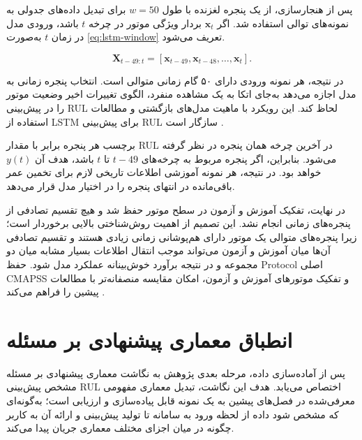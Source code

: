 پس از هنجارسازی، از یک پنجره لغزنده با طول
$w=50$ برای تبدیل داده‌های جدولی به نمونه‌های توالی استفاده شد.
اگر $\mathbf{x}_t$ بردار ویژگی موتور در چرخه $t$ باشد، ورودی مدل
در زمان $t$ به‌صورت 
\ref{eq:lstm-window}
 تعریف می‌شود.

\begin{equation}
	\label{eq:lstm-window}
	\mathbf{X}_{t-49:t}
	=
	[
	\mathbf{x}_{t-49},
	\mathbf{x}_{t-48},
	\ldots,
	\mathbf{x}_{t}
	].
\end{equation}

در نتیجه، هر نمونه ورودی دارای ۵۰ گام زمانی متوالی است. انتخاب
پنجره زمانی به مدل اجازه می‌دهد به‌جای اتکا به یک مشاهده منفرد،
الگوی تغییرات اخیر وضعیت موتور را در پیش‌بینی \gls{RUL} لحاظ کند.
این رویکرد با ماهیت مدل‌های بازگشتی و مطالعات استفاده از LSTM برای
پیش‌بینی \gls{RUL} سازگار است \cite{heimes2008recurrent}.

برچسب هر پنجره برابر با مقدار \gls{RUL} در آخرین چرخه همان پنجره
در نظر گرفته می‌شود. بنابراین، اگر پنجره مربوط به چرخه‌های
$t-49$ تا $t$ باشد، هدف آن $y(t)$ خواهد بود. در نتیجه، هر نمونه
آموزشی اطلاعات تاریخی لازم برای تخمین عمر باقی‌مانده در انتهای
پنجره را در اختیار مدل قرار می‌دهد.

در نهایت، تفکیک آموزش و آزمون در سطح موتور حفظ شد و هیچ تقسیم
تصادفی از پنجره‌های زمانی انجام نشد. این تصمیم از اهمیت
روش‌شناختی بالایی برخوردار است؛ زیرا پنجره‌های متوالی یک موتور
دارای هم‌پوشانی زمانی زیادی هستند و تقسیم تصادفی آن‌ها میان
آموزش و آزمون می‌تواند موجب انتقال اطلاعات بسیار مشابه میان دو
مجموعه و در نتیجه برآورد خوش‌بینانه عملکرد مدل شود. حفظ \gls{Protocol}
اصلی \gls{CMAPSS} و تفکیک موتورهای آموزش و آزمون، امکان مقایسه منصفانه‌تر
با مطالعات پیشین را فراهم می‌کند \cite{NASA2007C-MAPSS}.





\section{انطباق معماری پیشنهادی بر مسئله }
\label{sec:arch-cmapss}

پس از آماده‌سازی داده، مرحله بعدی پژوهش به نگاشت معماری پیشنهادی
بر مسئله مشخص پیش‌بینی \gls{RUL} اختصاص می‌یابد. هدف این نگاشت،
تبدیل معماری مفهومی معرفی‌شده در فصل‌های پیشین به یک نمونه قابل
پیاده‌سازی و ارزیابی است؛ به‌گونه‌ای که مشخص شود داده از لحظه ورود
به سامانه تا تولید پیش‌بینی و ارائه آن به کاربر چگونه در میان
اجزای مختلف معماری جریان پیدا می‌کند.

